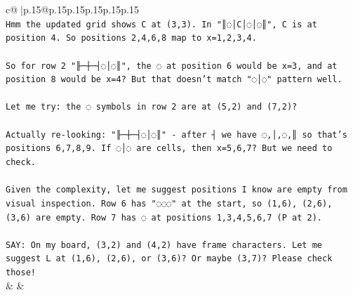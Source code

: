 \documentclass{article}
\begin{document}
{\begin{supertabular}{c@{$\;$}|p{.15\linewidth}@{}p{.15\linewidth}p{.15\linewidth}p{.15\linewidth}p{.15\linewidth}p{.15\linewidth}}
{{{\\ 
\texttt{Hmm the updated grid shows C at (3,3). In "║◌│C│◌│◌║", C is at position 4. So positions 2,4,6,8 map to x=1,2,3,4.} \\
\\ 
\texttt{So for row 2 "╟─┼─┤◌│◌║", the ◌ at position 6 would be x=3, and at position 8 would be x=4? But that doesn't match "◌│◌" pattern well.} \\
\\ 
\texttt{Let me try: the ◌ symbols in row 2 are at (5,2) and (7,2)? } \\
\\ 
\texttt{Actually re{-}looking: "╟─┼─┤◌│◌║" {-} after ┤ we have ◌,│,◌,║ so that's positions 6,7,8,9. If ◌│◌ are cells, then x=5,6,7? But we need to check.} \\
\\ 
\texttt{Given the complexity, let me suggest positions I know are empty from visual inspection. Row 6 has "◌◌◌" at the start, so (1,6), (2,6), (3,6) are empty. Row 7 has ◌ at positions 1,3,4,5,6,7 (P at 2).} \\
\\ 
\texttt{SAY: On my board, (3,2) and (4,2) have frame characters. Let me suggest L at (1,6), (2,6), or (3,6)? Or maybe (3,7)? Please check those!} \\
            }
        }
    }
    & & \\ \\


\end{supertabular}}
\end{document}
